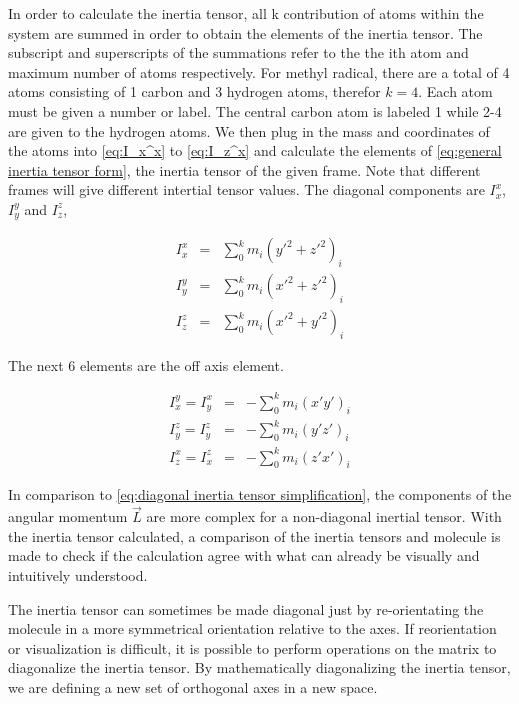 \documentclass[11pt,a4paper]{book}
\begin{document}
			In order to calculate the inertia tensor, all k contribution of atoms within the system are summed in order to obtain the elements of the inertia tensor. The subscript and superscripts of the summations refer to the the ith atom and maximum number of atoms respectively. For methyl radical, there are a total of 4 atoms consisting of 1 carbon and 3 hydrogen atoms, therefor $k=4$. Each atom must be given a number or label. The central carbon atom is labeled 1 while 2-4 are given to the hydrogen atoms. We then plug in the mass and coordinates of the atoms into \autoref{eq:I_x^x} to \autoref{eq:I_z^x} and calculate the elements of \autoref{eq:general inertia tensor form}, the inertia tensor of the given frame. Note that different frames will give different intertial tensor values. The diagonal components are $I_x^x$, $I_y^y$ and $I_z^z$,
			
			\begin{eqnarray}
				\label{eq:I_x^x}
					I_{x}^x &=&\sum_0^k{m_i(y'^{2} + z'^{2})_i}\\
				\label{eq:I_yy}
					I_{y}^y &=&\sum_0^k{m_i(x'^{2} + z'^{2})_i}\\
				\label{eq:I_zz}
					I_{z}^z &=&\sum_0^k{m_i(x'^{2} + y'^{2})_i}
			\end{eqnarray}
			
			\noindent
			The next 6 elements are the off axis element.
			
			\begin{eqnarray}
				\label{eq:I_x^y}
					I_x^y = I_y^x &=&-\sum_0^k{m_i(x'y')_i}\\
				\label{eq:I_y^z}
					I_{y}^{z} = I_{y}^{z} & = &-\sum_0^k{m_i(y'z')_i}\\
				\label{eq:I_z^x}
					I_{z}^{x} = I_{x}^{z} & = &-\sum_0^k{m_i(z'x')_i}
			\end{eqnarray}
			
			\noindent In comparison to \autoref{eq:diagonal inertia tensor simplification}, the components of the angular momentum $\vec{L}$ are more complex for a non-diagonal inertial tensor. With the inertia tensor calculated, a comparison of the inertia tensors and molecule is made to check if the calculation agree with what can already be visually and intuitively understood.
			
			The inertia tensor can sometimes be made diagonal just by re-orientating the molecule in a more symmetrical orientation relative to the axes. If reorientation or visualization is difficult, it is possible to perform operations on the matrix to diagonalize the inertia tensor. By mathematically diagonalizing the inertia tensor, we are defining a new set of orthogonal axes in a new space. 	
			
\end{document}
